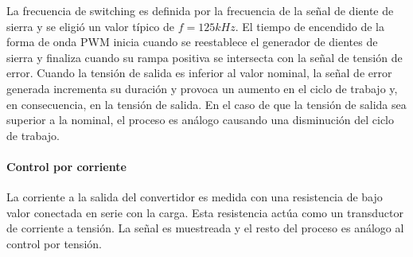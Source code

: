La frecuencia de switching es definida por la frecuencia de la señal de diente de sierra y se eligió un valor típico de $f=125kHz$.
El tiempo de encendido de la forma de onda PWM inicia cuando se reestablece el generador de dientes de sierra y finaliza cuando su rampa positiva se intersecta con la señal de tensión de error.
Cuando la tensión de salida es inferior al valor nominal, la señal de error generada incrementa su duración y provoca un aumento en el ciclo de trabajo y, en consecuencia, en la tensión de salida. 
En el caso de que la tensión de salida sea superior a la nominal, el proceso es análogo causando una disminución del ciclo de trabajo. 


\paragraph{Control por corriente}
La corriente a la salida del convertidor es medida con una resistencia de bajo valor conectada en serie con la carga.
Esta resistencia actúa como un transductor de corriente a tensión.
La señal es muestreada y el resto del proceso es análogo al control por tensión.\\


